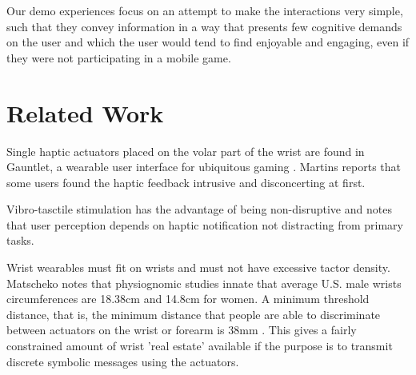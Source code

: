 \documentclass{chi-ext}
\begin{document}



Our demo experiences focus on an attempt to make the interactions very simple, such that they convey information in a way that presents few cognitive demands on the user and which the user would tend to find enjoyable and engaging, even if they were not participating in a mobile game. 


\section{Related Work}
Single haptic actuators placed on the volar part of the wrist are found in Gauntlet, a wearable user interface for ubiquitous gaming \cite{martins2008gauntlet}. Martins reports that some users found the haptic feedback intrusive and disconcerting at first.

Vibro-tasctile stimulation has the advantage of being non-disruptive \cite{matscheko2010tactor} and notes that user perception depends on haptic notification not distracting from primary tasks. 

Wrist wearables must fit on wrists and must not have excessive tactor density.  
Matscheko notes that physiognomic studies innate that average U.S. male wrists circumferences are 18.38cm and 14.8cm for women. A minimum threshold distance, that is, the minimum distance that people are able to discriminate between actuators on the wrist or forearm is 38mm \cite{matscheko2010tactor}. This gives a fairly constrained amount of wrist 'real estate' available if the purpose is to transmit discrete symbolic messages using the actuators. 
\end{document}
